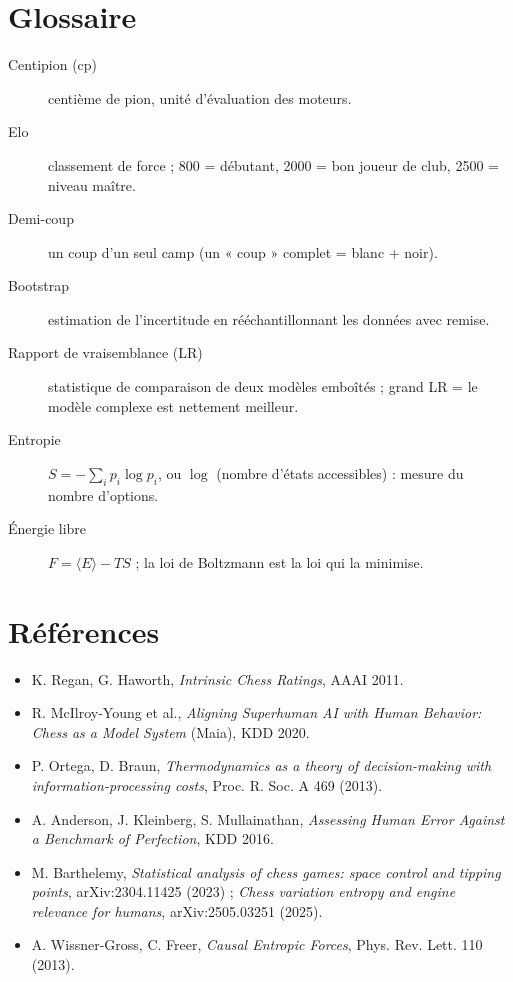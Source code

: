 \documentclass[11pt,a4paper]{article}
\begin{document}
\section*{Glossaire}
\begin{description}
  \item[Centipion (cp)] centième de pion, unité d'évaluation des moteurs.
  \item[Elo] classement de force ; 800 = débutant, 2000 = bon joueur de club, 2500 = niveau maître.
  \item[Demi-coup] un coup d'un seul camp (un « coup » complet = blanc + noir).
  \item[Bootstrap] estimation de l'incertitude en rééchantillonnant les données avec remise.
  \item[Rapport de vraisemblance (LR)] statistique de comparaison de deux modèles emboîtés ; grand LR = le
        modèle complexe est nettement meilleur.
  \item[Entropie] $S = -\sum_i p_i \log p_i$, ou $\log$ (nombre d'états accessibles) : mesure du nombre
        d'options.
  \item[Énergie libre] $F = \langle E\rangle - T S$ ; la loi de Boltzmann est la loi qui la minimise.
\end{description}

\section*{Références}
\small
\begin{itemize}
  \item K. Regan, G. Haworth, \emph{Intrinsic Chess Ratings}, AAAI 2011.
  \item R. McIlroy-Young et al., \emph{Aligning Superhuman AI with Human Behavior: Chess as a Model System}
        (Maia), KDD 2020.
  \item P. Ortega, D. Braun, \emph{Thermodynamics as a theory of decision-making with information-processing
        costs}, Proc. R. Soc. A 469 (2013).
  \item A. Anderson, J. Kleinberg, S. Mullainathan, \emph{Assessing Human Error Against a Benchmark of
        Perfection}, KDD 2016.
  \item M. Barthelemy, \emph{Statistical analysis of chess games: space control and tipping points},
        arXiv:2304.11425 (2023) ; \emph{Chess variation entropy and engine relevance for humans},
        arXiv:2505.03251 (2025).
  \item A. Wissner-Gross, C. Freer, \emph{Causal Entropic Forces}, Phys. Rev. Lett. 110 (2013).
\end{itemize}
\end{document}
